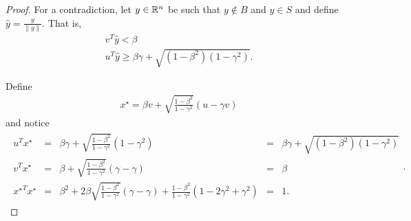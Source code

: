 \begin{proof}
For a contradiction, let $y \in \mathbb R^n$ be such that $y \not \in B$ and $y \in S$ and define $\hat y = \frac{y}{\|y\|}$.
That is,
\begin{align}
v^T\hat y < \beta \label{csc_vy} \\
u^T\hat y \ge \beta\gamma + \sqrt{\left(1 - \beta^2\right)\left(1 - \gamma^2\right)}. \label{csc_uy}
\end{align}

Define
\begin{align*}
x^{\star} = \beta v + \sqrt{\frac{1 - \beta^2}{1 - \gamma^2}} (u - \gamma v )
\end{align*} and notice
\begin{align}
\begin{array}{ccccc}
{u}^Tx^{\star} &=& \beta\gamma + \sqrt{\frac{1 - \beta^2}{1 - \gamma^2}} (1 - \gamma^2) &=&  \beta\gamma + \sqrt{\left(1 - \beta^2\right)\left(1 - \gamma^2\right)} \\
{v}^Tx^{\star} &=& \beta + \sqrt{\frac{1 - \beta^2}{1 - \gamma^2}}(\gamma - \gamma) &=& \beta \\
{x^{\star}}^Tx^{\star} &=& \beta^2 + 2\beta\sqrt{\frac{1 - \beta^2}{1 - \gamma^2}}(\gamma - \gamma) + \frac{1 - \beta^2}{1 - \gamma^2} (1- 2\gamma^2 + \gamma^2)&=& 1.
\end{array}. \label{csc_vx_ux}
\end{align}


\end{proof}
